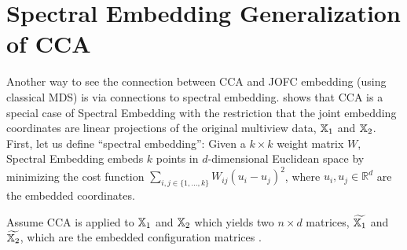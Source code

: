 \documentclass[12pt,oneside,final]{thesis}\usepackage[]{graphicx}\usepackage[]{color}
\begin{document}
\section{Spectral Embedding Generalization of CCA}

Another way to see the connection between CCA and JOFC embedding (using classical MDS) is via connections to spectral embedding. \cite{CCAviaSpectralEmbed} shows that CCA is a special case of Spectral Embedding with the restriction that the joint embedding coordinates are linear projections of the original multiview data, $\mathbb{X}_1$ and $\mathbb{X}_2$. First, let us define ``spectral embedding'':
Given  a $k \times k$ weight matrix $W$, Spectral Embedding embeds $k$ points in $d$-dimensional Euclidean space by  minimizing the cost function $\sum_{i,j \in \{1,\ldots,k\}}W_{ij}\left(u_i-u_j\right)^2$, where $u_i, u_j \in \mathbb{R}^d$ are the embedded coordinates.

Assume CCA is applied to $\mathbb{X}_1$ and $\mathbb{X}_2$ which yields two  $n \times d$ matrices, $\widetilde{\mathbb{X}_1}$ and $\widetilde{\mathbb{X}_2}$,  which are the embedded configuration matrices . 
\end{document}

